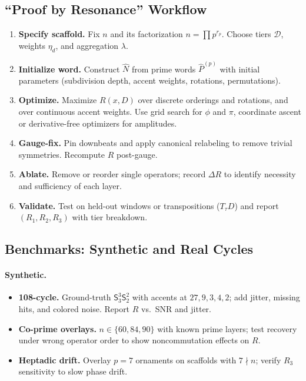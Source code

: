 \documentclass[12pt]{article}
\numberwithin{equation}{section}
\theoremstyle{plain}
\theoremstyle{definition}
\theoremstyle{remark}
\begin{document}
\subsection*{“Proof by Resonance” Workflow}
\begin{enumerate}
  \item \textbf{Specify scaffold.} Fix $n$ and its factorization $n=\prod p^{r_p}$. Choose tiers $\mathcal{D}$, weights $\eta_d$, and aggregation $\lambda$.
  \item \textbf{Initialize word.} Construct $\widehat{N}$ from prime words $\hat{P}^{(p)}$ with initial parameters (subdivision depth, accent weights, rotations, permutations).
  \item \textbf{Optimize.} Maximize $R(x,D)$ over discrete orderings and rotations, and over continuous accent weights. Use grid search for $\phi$ and $\pi$, coordinate ascent or derivative-free optimizers for amplitudes.
  \item \textbf{Gauge-fix.} Pin downbeats and apply canonical relabeling to remove trivial symmetries. Recompute $R$ post-gauge.
  \item \textbf{Ablate.} Remove or reorder single operators; record $\Delta R$ to identify necessity and sufficiency of each layer.
  \item \textbf{Validate.} Test on held-out windows or transpositions ($T_\tau D$) and report $(R_1,R_2,R_3)$ with tier breakdown.
\end{enumerate}

\subsection*{Benchmarks: Synthetic and Real Cycles}
\paragraph{Synthetic.}
\begin{itemize}
  \item \textbf{108-cycle.} Ground-truth $\mathsf{S}_3^3\mathsf{S}_2^2$ with accents at $27,9,3,4,2$; add jitter, missing hits, and colored noise. Report $R$ vs.\ SNR and jitter.
  \item \textbf{Co-prime overlays.} $n\in\{60,84,90\}$ with known prime layers; test recovery under wrong operator order to show noncommutation effects on $R$.
  \item \textbf{Heptadic drift.} Overlay $p=7$ ornaments on scaffolds with $7\nmid n$; verify $R_3$ sensitivity to slow phase drift.
\end{itemize}
\end{document}
